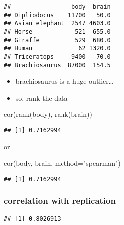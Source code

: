 \documentclass[
]{book}
\newenvironment{Shaded}{\begin{snugshade}}{\end{snugshade}}
\newcommand{\AttributeTok}[1]{\textcolor[rgb]{0.77,0.63,0.00}{#1}}
\newcommand{\FunctionTok}[1]{\textcolor[rgb]{0.00,0.00,0.00}{#1}}
\newcommand{\NormalTok}[1]{#1}
\newcommand{\SpecialCharTok}[1]{\textcolor[rgb]{0.00,0.00,0.00}{#1}}
\newcommand{\StringTok}[1]{\textcolor[rgb]{0.31,0.60,0.02}{#1}}
\providecommand{\tightlist}{%
  \setlength{\itemsep}{0pt}\setlength{\parskip}{0pt}}
\theoremstyle{definition}
\theoremstyle{definition}
\theoremstyle{definition}
\theoremstyle{definition}
\theoremstyle{remark}
\begin{document}
\begin{verbatim}
##                 body  brain
## Dipliodocus    11700   50.0
## Asian elephant  2547 4603.0
## Horse            521  655.0
## Giraffe          529  680.0
## Human             62 1320.0
## Triceratops     9400   70.0
## Brachiosaurus  87000  154.5
\end{verbatim}

\begin{itemize}
\tightlist
\item
  brachiosaurus is a huge outlier\ldots{}
\item
  so, rank the data
\end{itemize}

\begin{Shaded}
\begin{Highlighting}[]
\FunctionTok{cor}\NormalTok{(}\FunctionTok{rank}\NormalTok{(body), }\FunctionTok{rank}\NormalTok{(brain))}
\end{Highlighting}
\end{Shaded}

\begin{verbatim}
## [1] 0.7162994
\end{verbatim}

or

\begin{Shaded}
\begin{Highlighting}[]
\FunctionTok{cor}\NormalTok{(body, brain, }\AttributeTok{method=}\StringTok{"spearman"}\NormalTok{)}
\end{Highlighting}
\end{Shaded}

\begin{verbatim}
## [1] 0.7162994
\end{verbatim}

\hypertarget{correlation-with-replication}{%
\subsubsection{correlation with replication}\label{correlation-with-replication}}

\begin{Shaded}
\end{Shaded}

\begin{verbatim}
## [1] 0.8026913
\end{verbatim}
\end{document}
